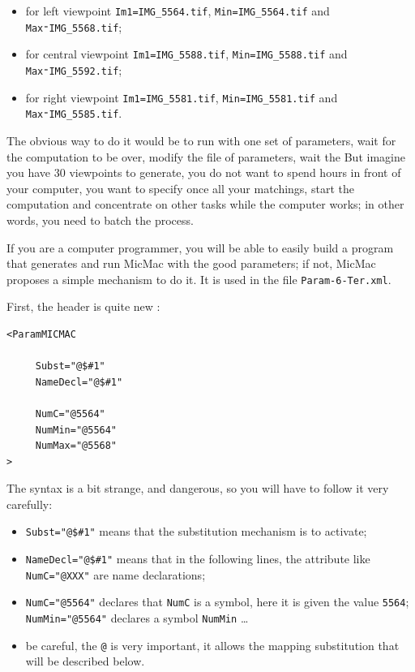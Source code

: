 \begin{itemize}
   \item  for left viewpoint {\tt Im1=IMG\_5564.tif}, {\tt Min=IMG\_5564.tif} and {\tt Max⁼IMG\_5568.tif};
   \item  for central viewpoint {\tt Im1=IMG\_5588.tif}, {\tt Min=IMG\_5588.tif} and {\tt Max⁼IMG\_5592.tif};
   \item  for right viewpoint {\tt Im1=IMG\_5581.tif}, {\tt Min=IMG\_5581.tif} and {\tt Max⁼IMG\_5585.tif}.
\end{itemize}


The obvious way to do it would be to run with one set of parameters, wait for the computation to be over,
modify the file of parameters, wait the \UNCLEAR{\dots} %
But imagine you have $30$ viewpoints to generate,
you do not want to spend hours in front of your computer, you want to specify once all your
matchings, start the computation and concentrate on other tasks while the computer works;
in other words, you need to batch the process.

If you are a computer programmer, you will be able to
easily build a program that generates and run MicMac with the good parameters; if
not, MicMac proposes a simple mechanism to do it. It is used
in the file {\tt Param-6-Ter.xml}.

First, the header is quite new :

{\scriptsize
\begin{verbatim}
<ParamMICMAC

     Subst="@$#1"
     NameDecl="@$#1"

     NumC="@5564"
     NumMin="@5564"
     NumMax="@5568"
>
\end{verbatim}
}

The syntax is a bit strange, and dangerous, so you will have to follow it
very carefully:

\begin{itemize}
   \item  {\tt Subst="@\$\#1"}  means that the substitution mechanism is to activate;

   \item  {\tt  NameDecl="@\$\#1"}  means that in the following lines, the attribute
         like {\tt NumC="@XXX"} are name declarations;

   \item  {\tt  NumC="@5564"}  declares that {\tt NumC} is a symbol, here  it is given the
          value {\tt 5564};  {\tt NumMin="@5564"} declares a symbol {\tt NumMin} \dots

   \item  be careful, the {\tt @} is very important, it allows the mapping substitution
          that will be described below.
\end{itemize}


